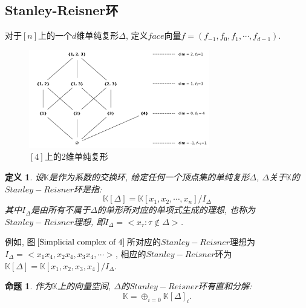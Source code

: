 \documentclass[12pt,a4paper]{ctexbook} %
\newcounter{theorem}[section]
\newtheorem{definition}[theorem]{定义}
\newtheorem{proposition}[theorem]{命题}
\numberwithin{figure}{section}
\theoremstyle{problemstyle}
\numberwithin{equation}{section} %
\begin{document}
	\subsection{Stanley-Reisner环}
	对于$[n]$上的一个$d$维单纯复形$\Delta$, 定义$face$向量$f=(f_{-1},f_0,f_1,\cdots,f_{d-1})$. 
		\vspace{-0.4cm} %
\begin{figure}[H]
	\centering
		\includegraphics[width=0.7\textwidth]{[4]上的2维单纯复形}
		\caption{$[4]$上的2维单纯复形}%
		\label{Simplicial complex of 4} %
\end{figure}
	
\begin{definition}
		设$\mathbb{K}$是作为系数的交换环, 给定任何一个顶点集的单纯复形$\Delta$, $\Delta$关于$\mathbb{K}$的$Stanley-Reisner$环是指: 
		$$\mathbb{K}[\Delta]=\mathbb{K}[x_1, x_2, \cdots, x_n]/I_{\Delta}$$
		其中$I_{\Delta}$是由所有不属于$\Delta$的单形所对应的单项式生成的理想, 也称为$Stanley-Reisner$理想, 即$I_{\Delta}=<x_{\tau}: \tau \notin \Delta>$. 
\end{definition}
	例如, 图$\ref{Simplicial complex of 4}$所对应的$Stanley-Reisner$理想为$I_{\Delta}=<x_1x_4, x_2x_4, x_3x_4, \cdots>$, 相应的$Stanley-Reisner$环为$\mathbb{K}[\Delta]=\mathbb{K}[x_1,x_2,x_3,x_4]/I_{ \Delta}$.
	
	\begin{proposition}
		作为$\mathbb{K}$上的向量空间, $\Delta$的$Stanley-Reisner$环有直和分解: 
		$$\mathbb{K}=\oplus_{i=0}\mathbb{K}[\Delta]_i.$$
	\end{proposition}
	
\end{document}
